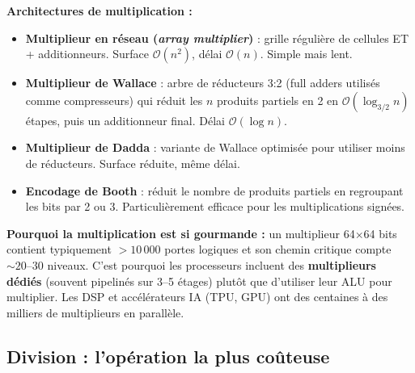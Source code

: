\documentclass[12pt,a4paper,twoside]{book}
\begin{document}
\begin{formule}
\textbf{Architectures de multiplication :}
\begin{itemize}[nosep]
\item \textbf{Multiplieur en réseau (\textit{array multiplier})} : grille régulière de cellules ET + additionneurs. Surface $\mathcal{O}(n^2)$, délai $\mathcal{O}(n)$. Simple mais lent.
\item \textbf{Multiplieur de Wallace} : arbre de réducteurs 3:2 (full adders utilisés comme compresseurs) qui réduit les $n$ produits partiels en 2 en $\mathcal{O}(\log_{3/2} n)$ étapes, puis un additionneur final. Délai $\mathcal{O}(\log n)$.
\item \textbf{Multiplieur de Dadda} : variante de Wallace optimisée pour utiliser moins de réducteurs. Surface réduite, même délai.
\item \textbf{Encodage de Booth} : réduit le nombre de produits partiels en regroupant les bits par 2 ou 3. Particulièrement efficace pour les multiplications signées.
\end{itemize}
\end{formule}

\begin{intuition}
\textbf{Pourquoi la multiplication est si gourmande :} un multiplieur 64$\times$64 bits contient typiquement $> 10\,000$ portes logiques et son chemin critique compte $\sim 20$--$30$ niveaux. C'est pourquoi les processeurs incluent des \textbf{multiplieurs dédiés} (souvent pipelinés sur 3--5 étages) plutôt que d'utiliser leur ALU pour multiplier. Les DSP et accélérateurs IA (TPU, GPU) ont des centaines à des milliers de multiplieurs en parallèle.
\end{intuition}

\subsection{Division : l'opération la plus coûteuse}
\end{document}

